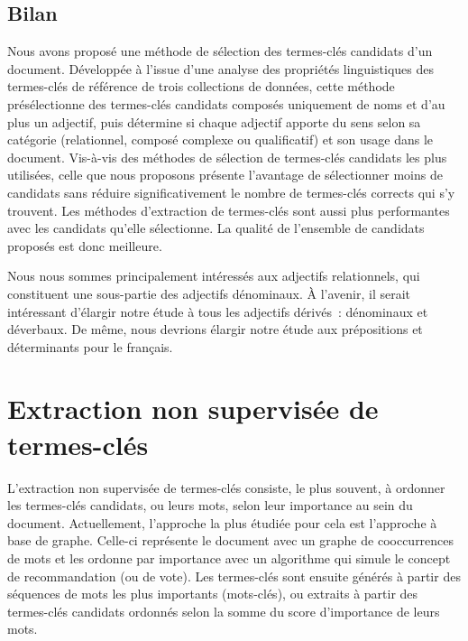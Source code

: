     \subsection{Bilan}
    \label{subsec:main:domain_independent_keyphrase_extraction-keyphrase_candidate_selection-conclusion}
      Nous avons proposé une méthode de sélection des termes-clés candidats d'un
      document. Développée à l'issue d'une analyse des propriétés linguistiques
      des termes-clés de référence de trois collections de données, cette 
      méthode présélectionne des termes-clés candidats composés uniquement de
      noms et d'au plus un adjectif, puis détermine si chaque adjectif
      apporte du sens selon sa catégorie (relationnel, composé complexe ou
      qualificatif) et son usage dans le document. Vis-à-vis des méthodes de
      sélection de termes-clés candidats les plus utilisées, celle que nous
      proposons présente l'avantage de sélectionner moins de candidats sans
      réduire significativement le nombre de termes-clés corrects qui s'y
      trouvent. Les méthodes d'extraction de termes-clés sont aussi plus
      performantes avec les candidats qu'elle sélectionne. La qualité de
      l'ensemble de candidats proposés est donc meilleure.

      Nous nous sommes principalement intéressés aux adjectifs relationnels, qui
      constituent une sous-partie des adjectifs dénominaux. À l'avenir, il
      serait intéressant d'élargir notre étude à tous les adjectifs dérivés~:
      dénominaux et déverbaux. De même, nous devrions élargir notre étude aux
      prépositions et déterminants pour le français.


  \section{Extraction non supervisée de termes-clés}
  \label{sec:main:domain_independent_keyphrase_extraction-unsupervised_automatic_keyphrase_extraction}
    L'extraction non supervisée de termes-clés consiste, le plus souvent, à
    ordonner les termes-clés candidats, ou leurs mots, selon leur importance au
    sein du document. Actuellement, l'approche la plus étudiée pour cela est
    l'approche à base de graphe. Celle-ci représente le document avec un graphe
    de cooccurrences de mots et les ordonne par importance avec un algorithme
    qui simule le concept de recommandation (ou de vote). Les termes-clés sont
    ensuite générés à partir des séquences de mots les plus importants
    (mots-clés), ou extraits à partir des termes-clés candidats ordonnés selon
    la somme du score d'importance de leurs mots.

